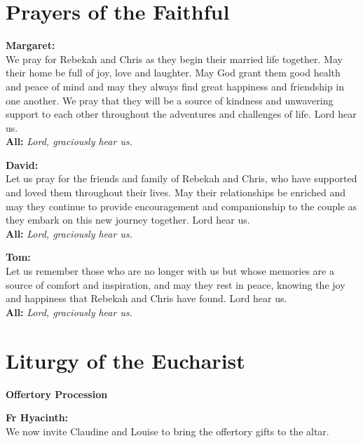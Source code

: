 \documentclass[12pt,landscape]{article}
\begin{document}
\begin{multicols}{2}
\section*{Prayers of the Faithful}

\textbf{Margaret:} \\
We pray for Rebekah and Chris as they begin their married life together. May their home be full of joy, love and laughter. May God grant them good health and peace of mind and may they always find great happiness and friendship in one another. We pray that they will be a source of kindness and unwavering support to each other throughout the adventures and challenges of life. Lord hear us.\\

\textbf{All:} \textit{Lord, graciously hear us.}

\vspace{1em}

\textbf{David:} \\
Let us pray for the friends and family of Rebekah and Chris, who have supported and loved them throughout their lives. May their relationships be enriched and may they continue to provide encouragement and companionship to the couple as they embark on this new journey together. Lord hear us.\\

\textbf{All:} \textit{Lord, graciously hear us.}

\vspace{1em}

\textbf{Tom:} \\
Let us remember those who are no longer with us but whose memories are a source of comfort and inspiration, and may they rest in peace, knowing the joy and happiness that Rebekah and Chris have found. Lord hear us.\\

\textbf{All:} \textit{Lord, graciously hear us.}

\columnbreak

\section*{Liturgy of the Eucharist}

\textbf{Offertory Procession}

\textbf{Fr Hyacinth:} \\
We now invite Claudine and Louise to bring the offertory gifts to the altar.


\end{multicols}
\end{document}
